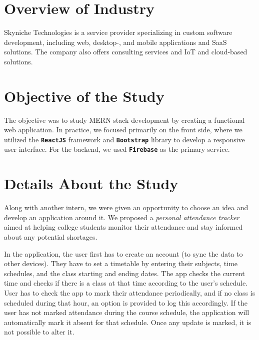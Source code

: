 \documentclass[12pt, a4paper]{article}
\newcommand{\ttbold}[1]{\textbf{\texttt{#1}}}
\begin{document}
\section*{Overview of Industry}
Skyniche Technologies is a service provider specializing in custom software development, including web, desktop-, and mobile applications and SaaS solutions. The company also offers consulting services and IoT and cloud-based solutions.

\section*{Objective of the Study}
The objective was to study MERN stack development by creating a functional web application. In practice, we focused primarily on the front side, where we utilized the \ttbold{ReactJS} framework and \ttbold{Bootstrap} library to develop a responsive user interface. For the backend, we used \ttbold{Firebase} as the primary service.

\section*{Details About the Study}
Along with another intern, we were given an opportunity to choose an idea and develop an application around it. We proposed a \textit{personal attendance tracker} aimed at helping college students monitor their attendance and stay informed about any potential shortages.

In the application, the user first has to create an account (to sync the data to other devices). They have to set a timetable by entering their subjects, time schedules, and the class starting and ending dates. The app checks the current time and checks if there is a class at that time according to the user's schedule. User has to check the app to mark their attendance periodically, and if no class is scheduled during that hour, an option is provided to log this accordingly. If the user has not marked attendance during the course schedule, the application will automatically mark it absent for that schedule. Once any update is marked, it is not possible to alter it.
\end{document}
